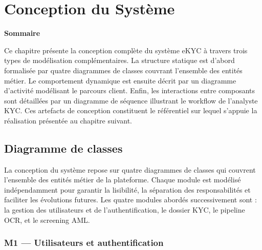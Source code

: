 
\chapter{Conception du Système}
\label{chap:conception}
\vspace{1em}
\noindent\textbf{\large Sommaire}
\vspace{0.5em}
\localtableofcontents
\clearpage

Ce chapitre présente la conception complète du système eKYC à travers trois types de modélisation complémentaires. La structure statique est d'abord formalisée par quatre diagrammes de classes couvrant l'ensemble des entités métier. Le comportement dynamique est ensuite décrit par un diagramme d'activité modélisant le parcours client. Enfin, les interactions entre composants sont détaillées par un diagramme de séquence illustrant le workflow de l'analyste KYC. Ces artefacts de conception constituent le référentiel sur lequel s'appuie la réalisation présentée au chapitre suivant.

\newcommand{\mline}[1]{\par\smallskip\noindent #1}

\section{Diagramme de classes}
\label{sec:diagramme-classes}

La conception du système repose sur quatre diagrammes de classes qui couvrent l'ensemble des entités métier de la plateforme. Chaque module est modélisé indépendamment pour garantir la lisibilité, la séparation des responsabilités et faciliter les évolutions futures. Les quatre modules abordés successivement sont : la gestion des utilisateurs et de l'authentification, le dossier KYC, le pipeline OCR, et le screening AML.

\subsection{M1 --- Utilisateurs et authentification}
\label{subsec:module1}

